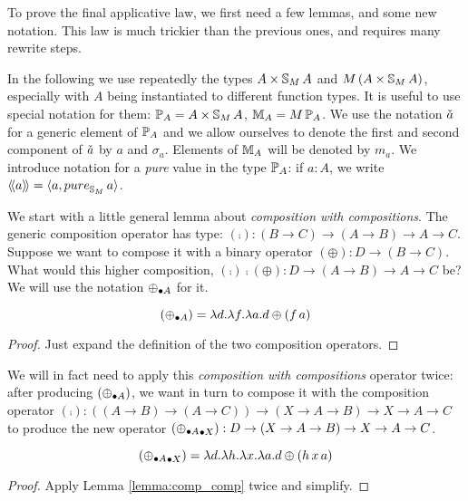 To prove the final applicative law, we first need a few lemmas, and some new notation.
This law is much trickier than the previous ones, and requires many rewrite steps.

In the following we use repeatedly the types $A\times \mathbb{S}_{M}\,A$ and $M\,(A\times \mathbb{S}_{M}\,A)$, especially with $A$ being instantiated to different function types.
It is useful to use special notation for them:
$\mathbb{P}_{A} = A\times \mathbb{S}_{M}\,A$, $\mathbb{M}_{A} = M\,\mathbb{P}_{A}$.
We use the notation $\check{a}$ for a generic element of $\mathbb{P}_{A}$
and we allow ourselves to denote the first and second component of $\check{a}$ by $a$ and $\sigma_a$.
Elements of $\mathbb{M}_{A}$ will be denoted by $m_a$.
We introduce notation for a {\em pure} value in the type $\mathbb{P}_{A}$:
if $a:A$, we write $\ppair{a} = \langle a, \apure_{\stream{M}}\,a \rangle$.



We start with a little general lemma about {\em composition with compositions}.
The generic composition operator has type: $(\comp): (B\rightarrow C) \rightarrow (A\rightarrow B) \rightarrow A \rightarrow C$.
Suppose we want to compose it with a binary operator $(\oplus) : D\rightarrow (B\rightarrow C)$.
What would this higher composition, $(\comp) \comp (\oplus) : D \rightarrow (A\rightarrow B) \rightarrow A \rightarrow C$ be?
We will use the notation $\mathbin{\oplus_{\bullet A}}$ for it.
\begin{lemma}\label{lemma:comp_comp}

$$
(\mathbin{\oplus_{\bullet A}}) = \lambda d.\lambda f. \lambda a. d\oplus (f\,a)
$$

\end{lemma}
\begin{proof}
Just expand the definition of the two composition operators.
\end{proof}

We will in fact need to apply this {\em composition with compositions} operator twice: after producing $(\mathbin{\oplus_{\bullet A}})$, we want in turn to compose it with the composition operator $(\comp): ((A\rightarrow B) \rightarrow (A\rightarrow C)) \rightarrow (X\rightarrow A\rightarrow B) \rightarrow X \rightarrow A \rightarrow C$ to produce the new operator $(\mathbin{\mathbin{\oplus_{\bullet A}}_{\bullet X}}): D\rightarrow (X\rightarrow A \rightarrow B) \rightarrow X \rightarrow A \rightarrow C$.
\begin{lemma}\label{lemma:comp_comp_comp}

$$
(\mathbin{\mathbin{\oplus_{\bullet A}}_{\bullet X}}) =
\lambda d. \lambda h. \lambda x.\lambda a. d\oplus (h\,x\,a)
$$

\end{lemma}
\begin{proof}
Apply Lemma \ref{lemma:comp_comp} twice and simplify.
\end{proof}

